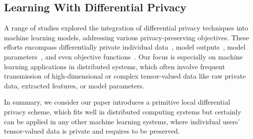 \subsection{Learning With Differential Privacy}
A range of studies explored the integration of differential privacy techniques into machine learning models, addressing various privacy-preserving objectives. These efforts encompass differentially private individual data~\cite{chanyaswad2018mvg,wang2018not}, model outputs~\cite{papernot2018scalable}, model parameters~\cite{lee2018concentrated,lecuyer2019privacy,yu2019differentially,song2013stochastic,shokri2015privacy,bassily2014private,wang2017differentially}, and even objective functions~\cite{phan2016differential,zhang2017efficient}. Our focus is especially on machine learning applications in distributed systems, which often involve frequent transmission of high-dimensional or complex tensor-valued data like raw private data, extracted features, or model parameters. 

In summary, we consider our paper introduces a primitive local differential privacy scheme, which fits well in distributed computing systems but certainly can be applied in any other machine learning systems, where individual users' tensor-valued data is private and requires to be preserved.